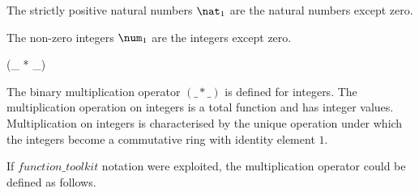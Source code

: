 \documentclass[draft,a4paper,10pt,wd]{isov2}
\begin{document}
The strictly positive natural numbers $\nat_1$
are the natural numbers except zero. 



The non-zero integers $\num_1$ are the integers except zero. 


\begin{zed}
 \leftassoc (\_ * \_)
\end{zed}


The binary multiplication operator $(\_ * \_)$ is defined for integers.
The multiplication operation on integers
is a total function and has integer values.
Multiplication on integers is characterised by the unique operation under
which the integers become a commutative ring with identity element $1$.
\begin{note}
If $function\_toolkit$ notation were exploited,
the multiplication operator could be defined as follows.
\end{note}
\end{document}
